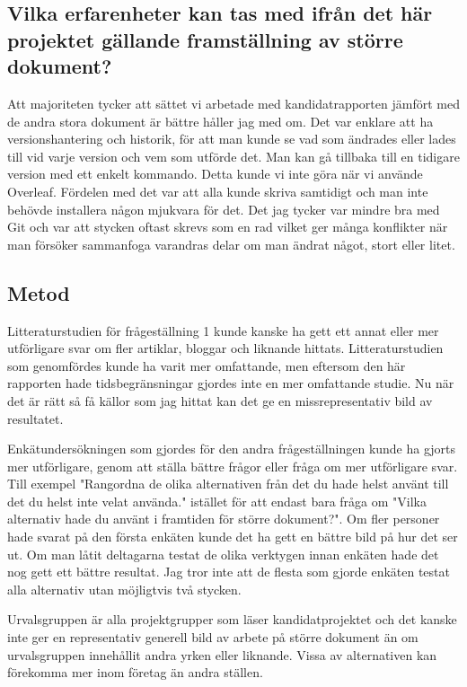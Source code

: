 \subsection{Vilka erfarenheter kan tas med ifrån det här projektet gällande framställning av större dokument?}
Att majoriteten tycker att sättet vi arbetade med kandidatrapporten jämfört med de andra stora dokument är bättre håller jag med om. Det var enklare att ha versionshantering och historik, för att man kunde se vad som ändrades eller lades till vid varje version och vem som utförde det. Man kan gå tillbaka till en tidigare version med ett enkelt kommando. Detta kunde vi inte göra när vi använde Overleaf. Fördelen med det var att alla kunde skriva samtidigt och man inte behövde installera någon mjukvara för det. Det jag tycker var mindre bra med Git och \latex var att stycken oftast skrevs som en rad vilket ger många konflikter när man försöker sammanfoga varandras delar om man ändrat något, stort eller litet.

\subsection{Metod}
Litteraturstudien för frågeställning 1 kunde kanske ha gett ett annat eller mer utförligare svar om fler artiklar, bloggar och liknande hittats. Litteraturstudien som genomfördes kunde ha varit mer omfattande, men eftersom den här rapporten hade tidsbegränsningar gjordes inte en mer omfattande studie. Nu när det är rätt så få källor som jag hittat kan det ge en missrepresentativ bild av resultatet.

Enkätundersökningen som gjordes för den andra frågeställningen kunde ha gjorts mer utförligare, genom att ställa bättre frågor eller fråga om mer utförligare svar. Till exempel "Rangordna de olika alternativen från det du hade helst använt till det du helst inte velat använda." istället för att endast bara fråga om "Vilka alternativ hade du använt i framtiden för större dokument?". Om fler personer hade svarat på den första enkäten kunde det ha gett en bättre bild på hur det ser ut. Om man låtit deltagarna testat de olika verktygen innan enkäten hade det nog gett ett bättre resultat. Jag tror inte att de flesta som gjorde enkäten testat alla alternativ utan möjligtvis två stycken.

Urvalsgruppen är alla projektgrupper som läser kandidatprojektet och det kanske inte ger en representativ generell bild av arbete på större dokument än om urvalsgruppen innehållit andra yrken eller liknande. Vissa av alternativen kan förekomma mer inom företag än andra ställen.

